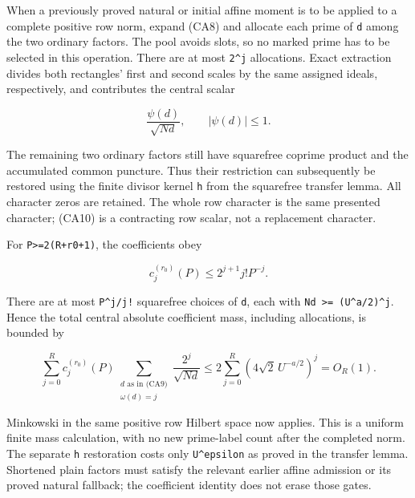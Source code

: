 When a previously proved natural or initial affine moment is to be applied to a complete positive row norm, expand (CA8) and allocate each prime of \texttt{d} among the two ordinary factors. The pool avoids slots, so no marked prime has to be selected in this operation. There are at most \texttt{2\^{}j} allocations. Exact extraction divides both rectangles' first and second scales by the same assigned ideals, respectively, and contributes the central scalar

\[
 \frac{\psi(d)}{\sqrt{Nd}},\qquad |\psi(d)|\le1.
\tag{CA10}
\]

The remaining two ordinary factors still have squarefree coprime product and the accumulated common puncture. Thus their restriction can subsequently be restored using the finite divisor kernel \texttt{h} from the squarefree transfer lemma. All character zeros are retained. The whole row character is the same presented character; (CA10) is a contracting row scalar, not a replacement character.

For \texttt{P\textgreater{}=2(R+r0+1)}, the coefficients obey

\[
 c_j^{(r_0)}(P)\le 2^{j+1}j!P^{-j}.
\]

There are at most \texttt{P\^{}j/j!} squarefree choices of \texttt{d}, each with \texttt{Nd\ \textgreater{}=\ (U\^{}a/2)\^{}j}. Hence the total central absolute coefficient mass, including allocations, is bounded by

\[
 \sum_{j=0}^{R}c_j^{(r_0)}(P)
 \sum_{\substack{d\text{ as in (CA9)}\\\omega(d)=j}}
             \frac{2^j}{\sqrt{Nd}}
 \le 2\sum_{j=0}^{R}(4\sqrt2\,U^{-a/2})^j=O_R(1).
\tag{CA11}
\]

Minkowski in the same positive row Hilbert space now applies. This is a uniform finite mass calculation, with no new prime-label count after the completed norm. The separate \texttt{h} restoration costs only \texttt{U\^{}epsilon} as proved in the transfer lemma. Shortened plain factors must satisfy the relevant earlier affine admission or its proved natural fallback; the coefficient identity does not erase those gates.

